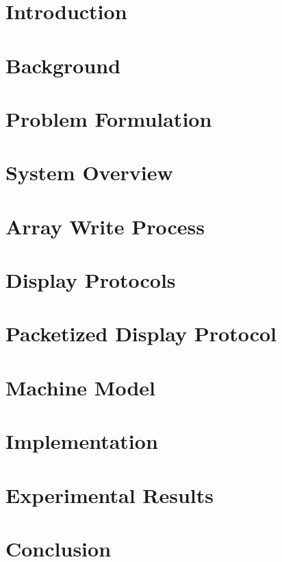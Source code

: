 \documentclass{udthesis}
\begin{document}

    \chapter{Introduction}
        
    \chapter{Background}
        
    \chapter{Problem Formulation}
        
    \chapter{System Overview}
        
    \chapter{Array Write Process} %
        
    \chapter{Display Protocols} %
        
    \chapter{Packetized Display Protocol}
        
    \chapter{Machine Model}
        
    \chapter{Implementation}
        
    \chapter{Experimental Results}
        
    \chapter*{Conclusion}
        

    \renewcommand{\bibname}{References}
    \pdfstringdefDisableCommands{\let\uppercase\relax}
    
    
\end{document}

